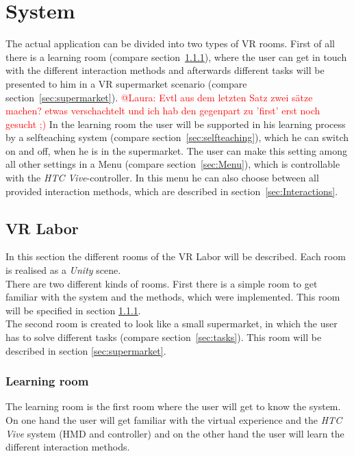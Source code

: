 
\section{System}\label{sec:System}
The actual application can be divided into two types of VR rooms. First of all there is a learning room (compare section~\ref{sec:Learningroom}), where the user can get in touch with the different interaction methods and afterwards different tasks will be presented to him in a VR supermarket scenario (compare section~\ref{sec:supermarket}). \textcolor{red}{@Laura: Evtl aus dem letzten Satz zwei sätze machen? etwas verschachtelt und ich hab den gegenpart zu 'first' erst noch gesucht ;)} In the learning room the user will be supported in his learning process by a selfteaching system (compare section~\ref{sec:selfteaching}), which he can switch on and off, when he is in the supermarket. The user can make this setting among all other settings in a Menu  (compare section~\ref{sec:Menu}), which is controllable with the \textit{HTC Vive}-controller. In this menu he can also choose between all provided interaction methods, which are described in section~\ref{sec:Interactions}.

\subsection{VR Labor}\label{sec:VRLabor}
In this section the different rooms of the VR Labor will be described. Each room is realised as a \textit{Unity} scene.\\
There are two different kinds of rooms. First there is a simple room to get familiar with the system and the methods, which were implemented. This room will be specified in  section \ref{sec:Learningroom}.\\
The second room is created to look like a small supermarket, in which the user has to solve different tasks (compare section~\ref{sec:tasks}). This room will be described in section \ref{sec:supermarket}.

\subsubsection{Learning room} \label{sec:Learningroom}
The learning room is the first room where the user will get to know the system. On one hand the user will get familiar with the virtual experience and the \textit{HTC Vive} system (HMD and controller) and on the other hand the user will learn the different interaction methods. 

